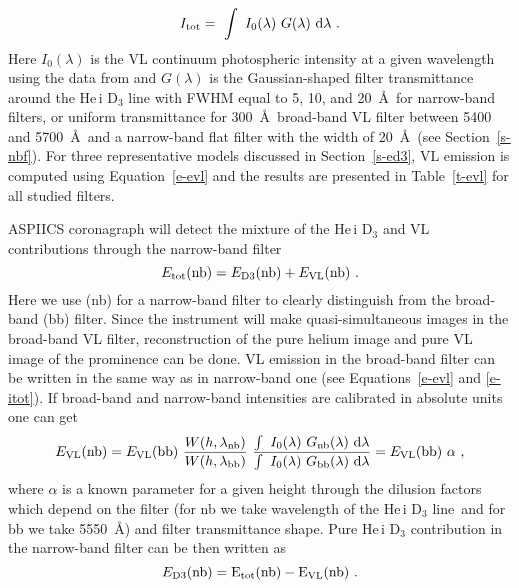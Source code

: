 \documentclass[namedreferences]{solarphysics}
\begin{document}
\begin{article}
\begin{equation}
I_{\rm tot} =~\int~I_{0}(\lambda)~G(\lambda)~{\rm d}\lambda \ .
\label{e-itot}
\end{equation}
Here $I_{0}(\lambda)$ is the VL continuum photospheric intensity at a given wavelength using the data from  and $G(\lambda)$ is the 
Gaussian-shaped filter transmittance around the He\,{\sc i} D$_{3}$ line with FWHM equal to 5, 10, and 20~\AA~for narrow-band filters, or uniform 
transmittance for 300~\AA~broad-band VL filter between 5400 and 5700~\AA~and a narrow-band flat filter with the width of 20~\AA~(see 
Section~\ref{s-nbf}). 
For three representative models discussed in Section~\ref{s-ed3}, VL emission is computed using Equation~\ref{e-evl} and the results 
are presented in Table~{\ref{t-evl}} for all studied filters.

ASPIICS coronagraph will detect the mixture of the He\,{\sc i} D$_{3}$ and VL contributions through the narrow-band filter 
\begin{equation}
E_{\rm tot}({\rm nb}) = E_{\rm D3}({\rm nb}) + E_{\rm VL}({\rm nb})  \ .
\label{e-mix}
\end{equation}
Here we use (nb)  for a narrow-band filter to clearly distinguish from the broad-band (bb) filter.
Since the instrument will make  quasi-simultaneous images in the broad-band VL filter, reconstruction of the pure helium image and pure VL 
image of the prominence can be done. VL emission in the broad-band filter can be written in the same way as in narrow-band one
(see Equations~\ref{e-evl} and \ref{e-itot}). 
If broad-band and narrow-band intensities are calibrated in absolute units one can get
\begin{equation}
E_{\rm VL}({\rm nb}) = E_{\rm VL}({\rm bb})~\frac{W(h, \lambda_{\rm nb})}{W(h, \lambda_{\rm bb})}~\frac{\int~I_{0}(\lambda)~G_{\rm nb}(\lambda)~{\rm d}\lambda }{\int~I_{0}(\lambda)~
G_{\rm bb}(\lambda)~{\rm d}\lambda }= E_{\rm VL}({\rm bb})~\alpha \ ,
\label{e-evlbb}
\end{equation}
where $\alpha$ is a known parameter for a given height through the dilusion factors which depend on the filter (for nb we take wavelength of the He\,{\sc i} D$_{3}$ line~and for bb we take 5550~\AA) and filter transmittance shape. 
Pure He\,{\sc i} D$_{3}$ contribution in the narrow-band filter can be then written as
\begin{equation}
E_{\rm D3}(\rm nb) = E_{\rm tot}({\rm nb}) - E_{\rm VL}({\rm nb}) \ .
\label{e-ped3}
\end{equation}



\end{article}
\end{document}
